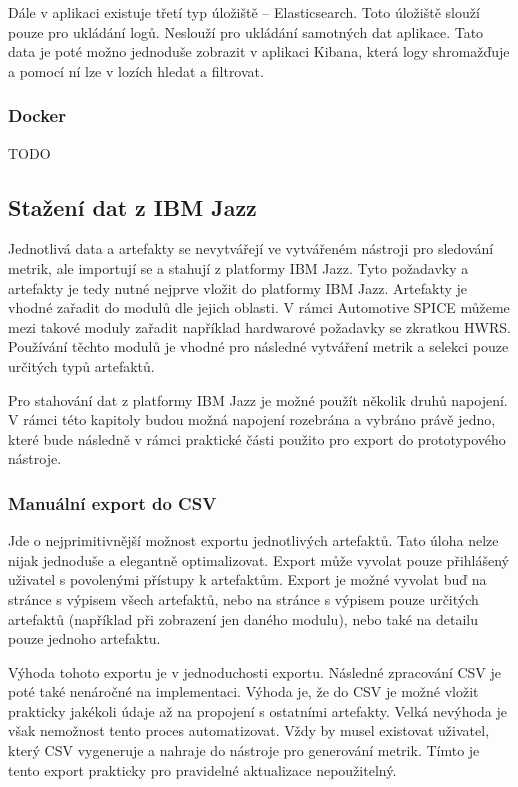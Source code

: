 \documentclass[czech,master,public,dept460,male,cpdeclaration,oneside]{diploma}
\begin{document}
Dále v aplikaci existuje třetí typ úložiště -- Elasticsearch. Toto úložiště slouží pouze pro ukládání logů. Neslouží pro ukládání samotných dat aplikace. Tato data je poté možno jednoduše zobrazit v aplikaci Kibana, která logy shromažďuje a pomocí ní lze v lozích hledat a filtrovat. 

\subsubsection{Docker}
\label{sec:docker}
TODO 

\subsection{Stažení dat z IBM Jazz}
Jednotlivá data a artefakty se nevytvářejí ve vytvářeném nástroji pro sledování metrik, ale importují se a stahují z platformy IBM Jazz. Tyto požadavky a artefakty je tedy nutné nejprve vložit do platformy IBM Jazz. Artefakty je vhodné zařadit do modulů dle jejich oblasti. V rámci Automotive SPICE můžeme mezi takové moduly zařadit například hardwarové požadavky se zkratkou HWRS. Používání těchto modulů je vhodné pro následné vytváření metrik a selekci pouze určitých typů artefaktů.

Pro stahování dat z platformy IBM Jazz je možné použít několik druhů napojení. V rámci této kapitoly budou možná napojení rozebrána a vybráno právě jedno, které bude následně v rámci praktické části použito pro export do prototypového nástroje.

\subsubsection{Manuální export do CSV}
Jde o nejprimitivnější možnost exportu jednotlivých artefaktů. Tato úloha nelze nijak jednoduše a elegantně optimalizovat. Export může vyvolat pouze přihlášený uživatel s povolenými přístupy k artefaktům. Export je možné vyvolat buď na stránce s výpisem všech artefaktů, nebo na stránce s výpisem pouze určitých artefaktů (například při zobrazení jen daného modulu), nebo také na detailu pouze jednoho artefaktu.

Výhoda tohoto exportu je v jednoduchosti exportu. Následné zpracování CSV je poté také nenáročné na implementaci. Výhoda je, že do CSV je možné vložit prakticky jakékoli údaje až na propojení s ostatními artefakty. Velká nevýhoda je však nemožnost tento proces automatizovat. Vždy by musel existovat uživatel, který CSV vygeneruje a nahraje do nástroje pro generování metrik. Tímto je tento export prakticky pro pravidelné aktualizace nepoužitelný.
\end{document}
